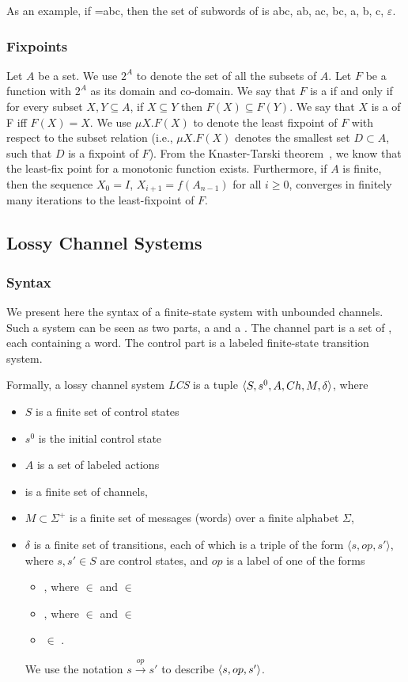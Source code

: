 As an example, if =abc, then the set of subwords of  is {abc, ab, ac, bc, a, b, c, $\varepsilon$}.

\subsubsection{Fixpoints}
Let $A$ be a set. We use $2^A$ to denote the set of all the subsets of $A$. Let $F$ be a function with $2^A$ as its domain and co-domain. We say that $F$ is a  if and only if for every subset $X,Y \subseteq A$, if $X \subseteq Y$ then $F(X) \subseteq F(Y)$.  We say that $X$ is a  of F iff $F(X)=X$. We use $\mu X. F(X)$ to denote the least fixpoint of $F$ with respect to the subset relation (i.e.,  $\mu X. F(X)$ denotes the smallest set $D \subset A$, such that $D$ is a fixpoint of $F$). From the Knaster-Tarski theorem~\cite{tarski}, we know that the least-fix point for a monotonic function exists. Furthermore, if $A$ is finite, then the sequence $X_0 = I$, $X_{i+1} = f(A_{n-1})$ for all $i \geq 0$, converges in finitely many iterations to the least-fixpoint of $F$.

\subsection{Lossy Channel Systems}
\subsubsection{Syntax}
We present here the syntax of a finite-state system with unbounded channels. Such a system can be seen as two parts, a  and a . The channel part is a set of , each containing a word. The control part is a labeled finite-state transition system.

\label{CS}
Formally, a lossy channel system \emph{LCS} is a tuple $\langle S,s^0, A, Ch,M, \delta\rangle$, where
\begin{itemize}
  \item $S$ is a finite set of control states
  \item $s^0$ is the initial control state
  \item $A$ is a set of labeled actions
  \item {} is a finite set of channels,
  \item $M \subset \Sigma^+$ is a finite set of messages (words) over a finite alphabet $\Sigma$,
  \item $\delta$ is a finite set of transitions, each of which is a triple of the form $\langle s,op,s'\rangle$, where $s, s'\in S$ are control states, and $op$ is a label of one of the forms
    \begin{itemize}
      \item {}, where  $\in$  and  $\in$ 
      \item {}, where  $\in$  and  $\in$ 
      \item {} $\in$ .
    \end{itemize}
    We use the notation $s \xrightarrow{op} s'$ to describe $\langle s, op, s'\rangle$.
\end{itemize}

